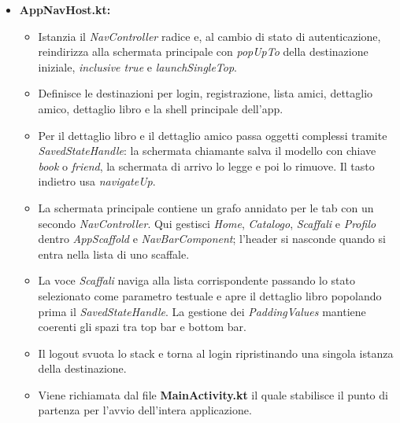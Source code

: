 \documentclass{article}
\begin{document}
\begin{itemize}
  \item \textbf{AppNavHost.kt:}
  \begin{itemize}
    \item Istanzia il \textit{NavController} radice e, al cambio di stato di autenticazione, reindirizza alla schermata principale con \textit{popUpTo} della destinazione iniziale, \textit{inclusive true} e \textit{launchSingleTop}.
    \item Definisce le destinazioni per login, registrazione, lista amici, dettaglio amico, dettaglio libro e la shell principale dell’app.
    \item Per il dettaglio libro e il dettaglio amico passa oggetti complessi tramite \textit{SavedStateHandle}: la schermata chiamante salva il modello con chiave \textit{book} o \textit{friend}, la schermata di arrivo lo legge e poi lo rimuove. Il tasto indietro usa \textit{navigateUp}.
    \item La schermata principale contiene un grafo annidato per le tab con un secondo \textit{NavController}. Qui gestisci \textit{Home}, \textit{Catalogo}, \textit{Scaffali} e \textit{Profilo} dentro \textit{AppScaffold} e \textit{NavBarComponent}; l’header si nasconde quando si entra nella lista di uno scaffale.
    \item La voce \textit{Scaffali} naviga alla lista corrispondente passando lo stato selezionato come parametro testuale e apre il dettaglio libro popolando prima il \textit{SavedStateHandle}. La gestione dei \textit{PaddingValues} mantiene coerenti gli spazi tra top bar e bottom bar.
    \item Il logout svuota lo stack e torna al login ripristinando una singola istanza della destinazione.
    \item Viene richiamata dal file \textbf{MainActivity.kt} il quale stabilisce il punto di partenza per l'avvio dell'intera applicazione.
  \end{itemize}


\end{itemize}
\end{document}
